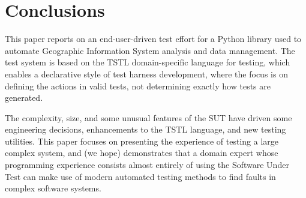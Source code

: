 \section{Conclusions}
\label{conclusion}

This paper reports on an end-user-driven test effort for a Python
library used to automate Geographic Information System analysis and
data management.  The test system is based on the TSTL
\cite{NFM15,ISSTA15,tstl} domain-specific language for testing, which
enables a declarative style of test harness development, where the
focus is on defining the actions in valid tests, not determining
exactly how tests are generated.

The complexity, size, and some unusual features of
the SUT have driven some engineering decisions, enhancements to the
TSTL language, and new testing utilities.  This paper focuses on
presenting the experience of testing a large complex system, and (we
hope) demonstrates that a domain expert whose programming experience
consists almost entirely of using the Software Under Test can make use
of modern automated testing methods to find faults in complex software systems.